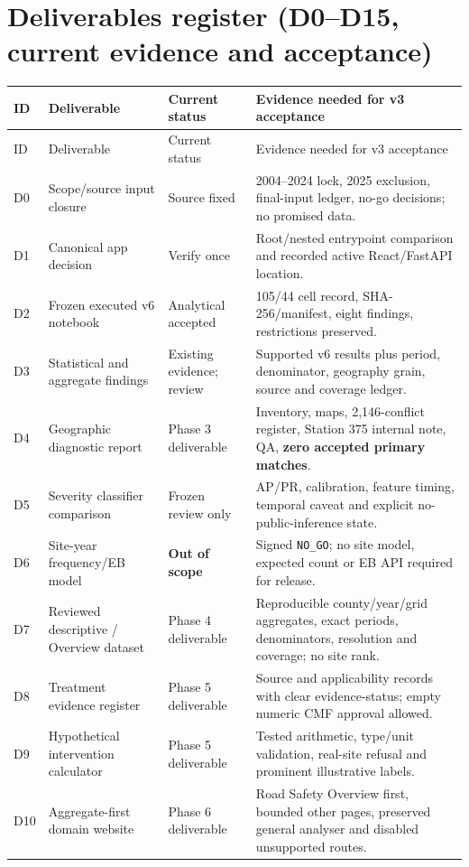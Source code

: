 \documentclass[11pt,a4paper,openany]{report}
\newcommand{\pathcode}[1]{\nolinkurl{#1}}
\begin{document}
\section{Deliverables register (D0--D15, current evidence and acceptance)}
\small
\begin{longtable}{@{}L{10mm}L{42mm}L{29mm}L{62mm}@{}}\toprule ID & Deliverable & Current status & Evidence needed for v3 acceptance\\\midrule\endfirsthead
\toprule ID & Deliverable & Current status & Evidence needed for v3 acceptance\\\midrule\endhead
D0 & Scope/source input closure & Source fixed & 2004--2024 lock, 2025 exclusion, final-input ledger, no-go decisions; no promised data.\\
D1 & Canonical app decision & Verify once & Root/nested entrypoint comparison and recorded active React/FastAPI location.\\
D2 & Frozen executed v6 notebook & Analytical accepted & 105/44 cell record, SHA-256/manifest, eight findings, restrictions preserved.\\
D3 & Statistical and aggregate findings & Existing evidence; review & Supported v6 results plus period, denominator, geography grain, source and coverage ledger.\\
D4 & Geographic diagnostic report & Phase 3 deliverable & Inventory, maps, 2,146-conflict register, Station 375 internal note, QA, \textbf{zero accepted primary matches}.\\
D5 & Severity classifier comparison & Frozen review only & AP/PR, calibration, feature timing, temporal caveat and explicit no-public-inference state.\\
D6 & Site-year frequency/EB model & \textbf{Out of scope} & Signed \pathcode{NO_GO}; no site model, expected count or EB API required for release.\\
D7 & Reviewed descriptive / Overview dataset & Phase 4 deliverable & Reproducible county/year/grid aggregates, exact periods, denominators, resolution and coverage; no site rank.\\
D8 & Treatment evidence register & Phase 5 deliverable & Source and applicability records with clear evidence-status; empty numeric CMF approval allowed.\\
D9 & Hypothetical intervention calculator & Phase 5 deliverable & Tested arithmetic, type/unit validation, real-site refusal and prominent illustrative labels.\\
D10 & Aggregate-first domain website & Phase 6 deliverable & Road Safety Overview first, bounded other pages, preserved general analyser and disabled unsupported routes.\\

\end{longtable}
\end{document}
